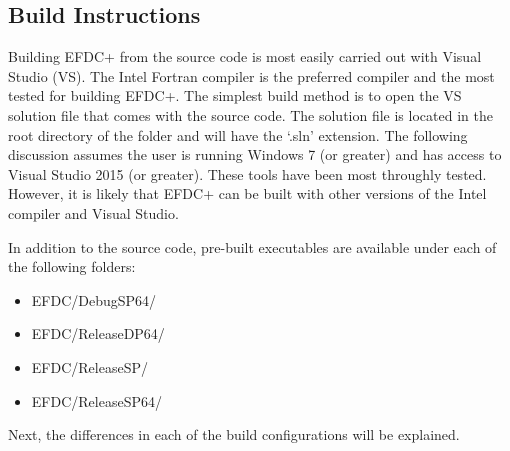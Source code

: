 \documentclass[letterpaper,10pt,english]{sphinxmanual}
\begin{document}
\subsection{Build Instructions}
\label{\detokenize{started/build:build-instructions}}\label{\detokenize{started/build:build}}\label{\detokenize{started/build::doc}}
Building EFDC+ from the source code is most easily carried out with Visual Studio (VS).  The Intel Fortran compiler is the preferred compiler and the most tested for building EFDC+.  The simplest build method is to open the VS solution file that comes with the source code.  The solution file is located in the root directory of the  folder and will have the ‘.sln’ extension.  The following discussion assumes the user is running Windows 7 (or greater) and has access to Visual Studio 2015 (or greater).  These tools have been most throughly tested.  However, it is likely that EFDC+ can be built with other versions of the Intel compiler and Visual Studio.

In addition to the source code, pre-built executables are available under each of the following folders:
\begin{itemize}
\item {} 
EFDC/DebugSP64/

\item {} 
EFDC/ReleaseDP64/

\item {} 
EFDC/ReleaseSP/

\item {} 
EFDC/ReleaseSP64/

\end{itemize}

Next, the differences in each of the build configurations will be explained.
\end{document}
